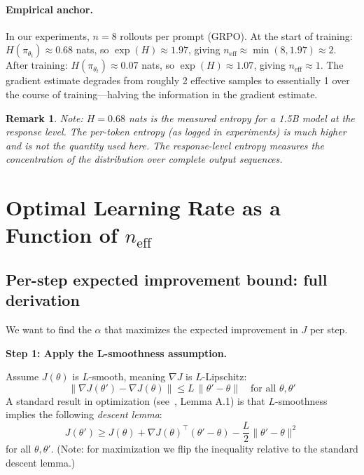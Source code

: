 \documentclass[11pt,a4paper]{article}
\newcommand{\neff}{n_{\mathrm{eff}}}
\newcommand{\pith}{\pi_{\theta_t}}
\newtheorem{remark}{Remark}
\begin{document}
\paragraph{Empirical anchor.}
In our experiments, $n = 8$ rollouts per prompt (GRPO).
At the start of training: $H(\pith) \approx 0.68$ nats, so $\exp(H) \approx 1.97$,
giving $\neff \approx \min(8, 1.97) \approx 2$.
After training: $H(\pith) \approx 0.07$ nats, so $\exp(H) \approx 1.07$,
giving $\neff \approx 1$.
The gradient estimate degrades from roughly 2 effective samples to essentially 1
over the course of training---halving the information in the gradient estimate.

\begin{remark}
  Note: $H = 0.68$ nats is the measured entropy for a 1.5B model at the \emph{response level}.
  The per-token entropy (as logged in experiments) is much higher and is not the quantity used here.
  The response-level entropy measures the concentration of the distribution over complete output sequences.
\end{remark}

\section{Optimal Learning Rate as a Function of $\neff$}

\subsection{Per-step expected improvement bound: full derivation}
\label{sec:bound-derivation}

We want to find the $\alpha$ that maximizes the expected improvement in $J$ per step.

\textbf{Step 1: Apply the L-smoothness assumption.}

Assume $J(\theta)$ is $L$-smooth, meaning $\nabla J$ is $L$-Lipschitz:
\begin{equation}
  \|\nabla J(\theta') - \nabla J(\theta)\| \leq L\,\|\theta' - \theta\|
  \quad \text{for all } \theta, \theta'
  \label{eq:lipschitz}
\end{equation}
A standard result in optimization (see~\cite{bottou2018optimization}, Lemma A.1) is that $L$-smoothness
implies the following \emph{descent lemma}:
\begin{equation}
  J(\theta') \geq J(\theta) + \nabla J(\theta)^\top(\theta' - \theta) - \frac{L}{2}\|\theta' - \theta\|^2
  \label{eq:descent-lemma}
\end{equation}
for all $\theta, \theta'$.
(Note: for maximization we flip the inequality relative to the standard descent lemma.)
\end{document}
